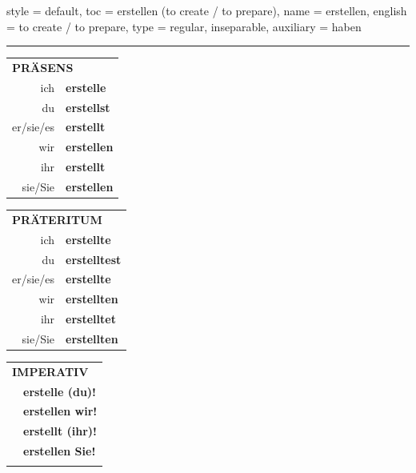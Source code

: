 \begin{verbentry}{
  style = {default},
  toc = {erstellen (to create / to prepare)},
  name = {erstellen},
  english = {to create / to prepare},
  type = {regular, inseparable},
  auxiliary = {haben}
}
 
    
     \vspace{5pt}

    \hrule
    
    \vspace{5pt}

  \begin{tabular}{rl}
     \multicolumn{2}{l}{\textbf{PRÄSENS} }\\
    ich & \textbf{erstelle}\\
    du & \textbf{erstellst}\\
    er/sie/es & \textbf{erstellt}\\
    wir & \textbf{erstellen}\\
    ihr & \textbf{erstellt}\\
    sie/Sie & \textbf{erstellen}\\
  \end{tabular}
  \hfill
     \begin{tabular}{rl}
    \multicolumn{2}{l}{\textbf{PRÄTERITUM} }\\
    ich & \textbf{erstellte}\\
    du & \textbf{erstelltest}\\
    er/sie/es & \textbf{erstellte}\\
    wir & \textbf{erstellten}\\
    ihr & \textbf{erstelltet}\\
    sie/Sie & \textbf{erstellten}\\
  \end{tabular}
  \hfill
  \begin{tabular}{rl}
     \multicolumn{2}{l}{\textbf{IMPERATIV} }\\
   & \textbf{erstelle (du)!}\\
   & \textbf{erstellen wir!}\\
   & \textbf{erstellt (ihr)!}\\
   & \textbf{erstellen Sie!}\\
   & \vspace{10pt}
  \end{tabular}

    \vspace{10pt}


\end{verbentry}
